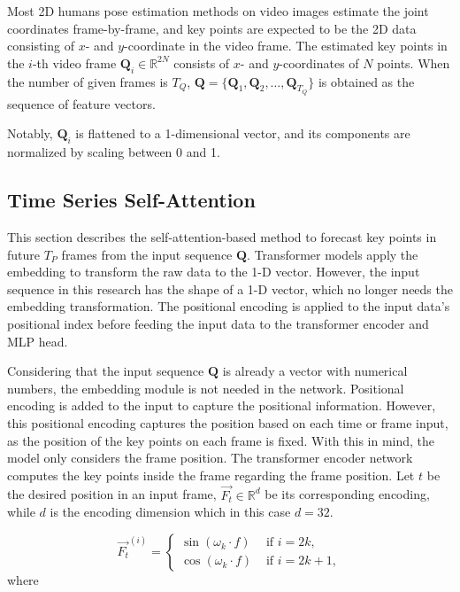 Most 2D humans pose estimation methods on video images estimate the joint coordinates frame-by-frame,
and key points are expected to be the 2D data consisting of $x$- and $y$-coordinate in the video frame.
The estimated key points in the $i$-th video frame $\mathbf{Q}_{i} \in \mathbb{R}^{2 N}$ consists of $x$- and $y$-coordinates of $N$ points.
When the number of given frames is $T_Q$,
$\mathbf{Q} = \{ \mathbf{Q}_{1}, \mathbf{Q}_{2}, \ldots, \mathbf{Q}_{T_Q} \}$ is obtained as the sequence of feature vectors.

Notably, $\mathbf{Q}_{i}$ is flattened to a 1-dimensional vector, and its components are normalized by scaling between 0 and 1.


\subsection{Time Series Self-Attention}
This section describes the self-attention-based method to forecast key points in future $T_{P}$ frames from the input sequence $\mathbf{Q}$.
Transformer models apply the embedding to transform the raw data to the 1-D vector.
However, the input sequence in this research has the shape of a 1-D vector, which no longer needs the embedding transformation. The positional encoding is applied to the input data's positional index before feeding the input data to the transformer encoder and MLP head.

Considering that the input sequence $\mathbf{Q}$ is already a vector with numerical numbers, the embedding module is not needed in the network.
Positional encoding is added to the input to capture the positional information.
However, this positional encoding captures the position based on each time or frame input, as the position of the key points on each frame is fixed.
With this in mind, the model only considers the frame position.
The transformer encoder network computes the key points inside the frame regarding the frame position.
Let $t$ be the desired position in an input frame, $\overrightarrow{F_{t}} \in \mathbb{R}^d$ be its corresponding encoding, while $d$ is the encoding dimension which in this case $d = 32$. 

\begin{equation}\label{eq:3_posenc}
    \overrightarrow{F_{t}}^{(i)} = \begin{cases}
        \sin (\omega_{k} \cdot f) & \text{ if $i = 2k$}, \\
        \cos (\omega_{k} \cdot f) & \text{ if $i = 2k + 1$},
    \end{cases}
\end{equation}
where 

